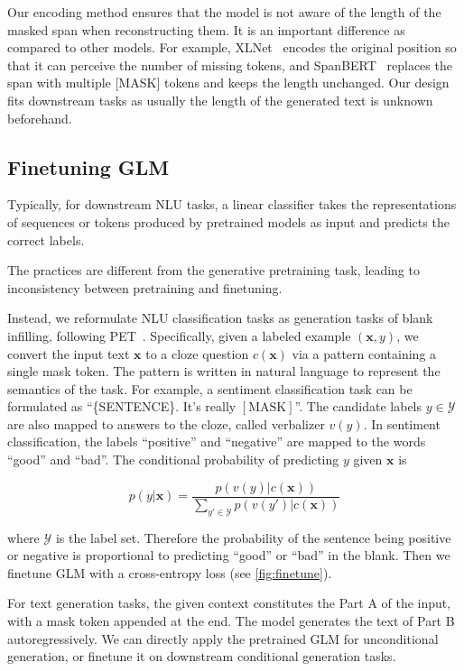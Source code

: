 Our encoding method ensures that the model is not aware of the length of the masked span when reconstructing them. It is an important difference as compared to other models. For example, XLNet~\cite{YangXLNet2019} encodes the original position so that it can perceive the number of missing tokens, and SpanBERT~\cite{joshiSpanBERT2020} replaces the span with multiple [MASK] tokens and keeps the length unchanged. Our design fits downstream tasks as usually the length of the generated text is unknown beforehand.

\subsection{Finetuning GLM}
\label{subsec:finetune}
Typically, for downstream NLU tasks, a linear classifier takes the representations of sequences or tokens produced by pretrained models as input and predicts the correct labels.

The practices are different from the generative pretraining task, leading to inconsistency between pretraining and finetuning. 

Instead, we reformulate NLU classification tasks as generation tasks of blank infilling, following PET~\cite{PET:2001-07676}. Specifically, given a labeled example $(\boldsymbol{x}, y)$, we convert the input text $\boldsymbol{x}$ to a cloze question $c(\boldsymbol{x})$ via a pattern containing a single mask token. The pattern is written in natural language to represent the semantics of the task. For example, a sentiment classification task can be formulated as ``\{SENTENCE\}. It's really $[\text{MASK}]$''. The candidate labels $y\in\mathcal{Y}$ are also mapped to answers to the cloze, called verbalizer $v(y)$. In sentiment classification, the labels ``positive'' and ``negative'' are mapped to the words ``good'' and ``bad''. The conditional probability of predicting $y$ given $\boldsymbol{x}$ is

\begin{equation}
    p(y|\boldsymbol{x})=\frac{p(v(y)|c(\boldsymbol{x}))}{\sum_{y'\in \mathcal{Y}}p(v(y')|c(\boldsymbol{x}))}
\end{equation}

where $\mathcal{Y}$ is the label set. Therefore the probability of the sentence being positive or negative is proportional to predicting ``good'' or ``bad'' in the blank. Then we finetune GLM with a cross-entropy loss (see \ref{fig:finetune}).

For text generation tasks, the given context constitutes the Part A of the input, with a mask token appended at the end. The model generates the text of Part B autoregressively. We can directly apply the pretrained GLM for unconditional generation, or finetune it on downstream conditional generation tasks.

